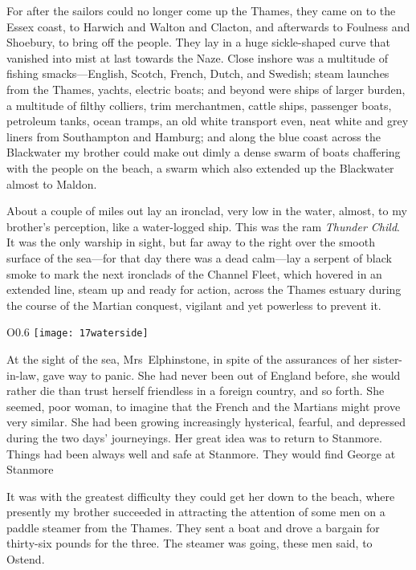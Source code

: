 For after the sailors could no longer come up the Thames, they came on to the Essex coast, to Harwich and Walton and Clacton, and afterwards to Foulness and Shoebury, to bring off the people. They lay in a huge sickle-shaped curve that vanished into mist at last towards the Naze. Close inshore was a multitude of fishing smacks—English, Scotch, French, Dutch, and Swedish; steam launches from the Thames, yachts, electric boats; and beyond were ships of larger burden, a multitude of filthy colliers, trim merchantmen, cattle ships, passenger boats, petroleum tanks, ocean tramps, an old white transport even, neat white and grey liners from Southampton and Hamburg; and along the blue coast across the Blackwater my brother could make out dimly a dense swarm of boats chaffering with the people on the beach, a swarm which also extended up the Blackwater almost to Maldon.

About a couple of miles out lay an ironclad, very low in the water, almost, to my brother's perception, like a water-logged ship. This was the ram \textit{Thunder Child}. It was the only warship in sight, but far away to the right over the smooth surface of the sea—for that day there was a dead calm—lay a serpent of black smoke to mark the next ironclads of the Channel Fleet, which hovered in an extended line, steam up and ready for action, across the Thames estuary during the course of the Martian conquest, vigilant and yet powerless to prevent it.

\begin{wrapfigure}{O}{0.6\textwidth}
\centering
\texttt{[image: 17waterside]}
\end{wrapfigure}


At the sight of the sea, Mrs~Elphinstone, in spite of the assurances of her sister-in-law, gave way to panic. She had never been out of England before, she would rather die than trust herself friendless in a foreign country, and so forth. She seemed, poor woman, to imagine that the French and the Martians might prove very similar. She had been growing increasingly hysterical, fearful, and depressed during the two days' journeyings. Her great idea was to return to Stanmore. Things had been always well and safe at Stanmore. They would find George at Stanmore\textellipsis

It was with the greatest difficulty they could get her down to the beach, where presently my brother succeeded in attracting the attention of some men on a paddle steamer from the Thames. They sent a boat and drove a bargain for thirty-six pounds for the three. The steamer was going, these men said, to Ostend.

